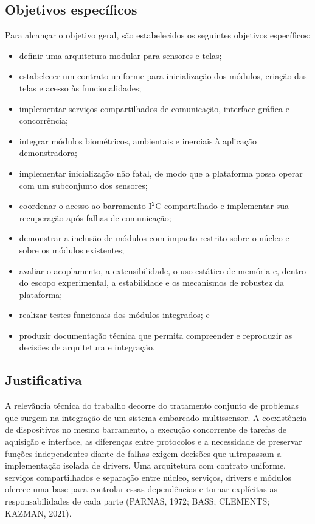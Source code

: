 \documentclass[a4paper,12pt]{article}
\begin{document}
\subsection{Objetivos espec\'ificos}

Para alcan\c{c}ar o objetivo geral, s\~ao estabelecidos os seguintes objetivos espec\'ificos:

\begin{itemize}
    \item definir uma arquitetura modular para sensores e telas;
    \item estabelecer um contrato uniforme para inicializa\c{c}\~ao dos m\'odulos, cria\c{c}\~ao das telas e acesso \`as funcionalidades;
    \item implementar servi\c{c}os compartilhados de comunica\c{c}\~ao, interface gr\'afica e concorr\^encia;
    \item integrar m\'odulos biom\'etricos, ambientais e inerciais \`a aplica\c{c}\~ao demonstradora;
    \item implementar inicializa\c{c}\~ao n\~ao fatal, de modo que a plataforma possa operar com um subconjunto dos sensores;
    \item coordenar o acesso ao barramento I$^2$C compartilhado e implementar sua recupera\c{c}\~ao ap\'os falhas de comunica\c{c}\~ao;
    \item demonstrar a inclus\~ao de m\'odulos com impacto restrito sobre o n\'ucleo e sobre os m\'odulos existentes;
    \item avaliar o acoplamento, a extensibilidade, o uso est\'atico de mem\'oria e, dentro do escopo experimental, a estabilidade e os mecanismos de robustez da plataforma;
    \item realizar testes funcionais dos m\'odulos integrados; e
    \item produzir documenta\c{c}\~ao t\'ecnica que permita compreender e reproduzir as decis\~oes de arquitetura e integra\c{c}\~ao.
\end{itemize}

\subsection{Justificativa}

A relev\^ancia t\'ecnica do trabalho decorre do tratamento conjunto de problemas que surgem na integra\c{c}\~ao de um sistema embarcado multissensor. A coexist\^encia de dispositivos no mesmo barramento, a execu\c{c}\~ao concorrente de tarefas de aquisi\c{c}\~ao e interface, as diferen\c{c}as entre protocolos e a necessidade de preservar fun\c{c}\~oes independentes diante de falhas exigem decis\~oes que ultrapassam a implementa\c{c}\~ao isolada de drivers. Uma arquitetura com contrato uniforme, servi\c{c}os compartilhados e separa\c{c}\~ao entre n\'ucleo, servi\c{c}os, drivers e m\'odulos oferece uma base para controlar essas depend\^encias e tornar expl\'icitas as responsabilidades de cada parte (PARNAS, 1972; BASS; CLEMENTS; KAZMAN, 2021).
\end{document}
